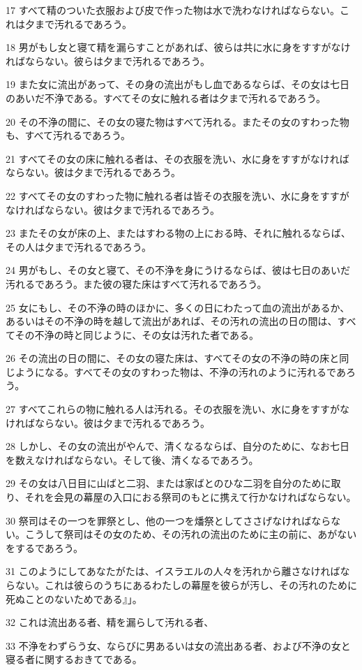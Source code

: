 \par 17 すべて精のついた衣服および皮で作った物は水で洗わなければならない。これは夕まで汚れるであろう。
\par 18 男がもし女と寝て精を漏らすことがあれば、彼らは共に水に身をすすがなければならない。彼らは夕まで汚れるであろう。
\par 19 また女に流出があって、その身の流出がもし血であるならば、その女は七日のあいだ不浄である。すべてその女に触れる者は夕まで汚れるであろう。
\par 20 その不浄の間に、その女の寝た物はすべて汚れる。またその女のすわった物も、すべて汚れるであろう。
\par 21 すべてその女の床に触れる者は、その衣服を洗い、水に身をすすがなければならない。彼は夕まで汚れるであろう。
\par 22 すべてその女のすわった物に触れる者は皆その衣服を洗い、水に身をすすがなければならない。彼は夕まで汚れるであろう。
\par 23 またその女が床の上、またはすわる物の上におる時、それに触れるならば、その人は夕まで汚れるであろう。
\par 24 男がもし、その女と寝て、その不浄を身にうけるならば、彼は七日のあいだ汚れるであろう。また彼の寝た床はすべて汚れるであろう。
\par 25 女にもし、その不浄の時のほかに、多くの日にわたって血の流出があるか、あるいはその不浄の時を越して流出があれば、その汚れの流出の日の間は、すべてその不浄の時と同じように、その女は汚れた者である。
\par 26 その流出の日の間に、その女の寝た床は、すべてその女の不浄の時の床と同じようになる。すべてその女のすわった物は、不浄の汚れのように汚れるであろう。
\par 27 すべてこれらの物に触れる人は汚れる。その衣服を洗い、水に身をすすがなければならない。彼は夕まで汚れるであろう。
\par 28 しかし、その女の流出がやんで、清くなるならば、自分のために、なお七日を数えなければならない。そして後、清くなるであろう。
\par 29 その女は八日目に山ばと二羽、または家ばとのひな二羽を自分のために取り、それを会見の幕屋の入口におる祭司のもとに携えて行かなければならない。
\par 30 祭司はその一つを罪祭とし、他の一つを燔祭としてささげなければならない。こうして祭司はその女のため、その汚れの流出のために主の前に、あがないをするであろう。
\par 31 このようにしてあなたがたは、イスラエルの人々を汚れから離さなければならない。これは彼らのうちにあるわたしの幕屋を彼らが汚し、その汚れのために死ぬことのないためである』」。
\par 32 これは流出ある者、精を漏らして汚れる者、
\par 33 不浄をわずらう女、ならびに男あるいは女の流出ある者、および不浄の女と寝る者に関するおきてである。

